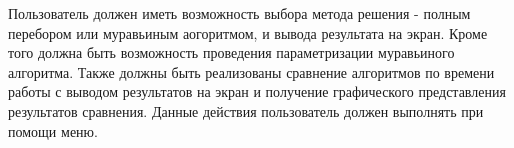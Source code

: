 Пользователь должен иметь возможность выбора метода решения - полным перебором или муравьиным аогоритмом, и вывода результата на экран. Кроме того должна быть возможность проведения параметризации муравьиного алгоритма. Также должны быть реализованы сравнение алгоритмов по времени работы с выводом результатов на экран и получение графического представления результатов сравнения. Данные действия пользователь должен выполнять при помощи меню.